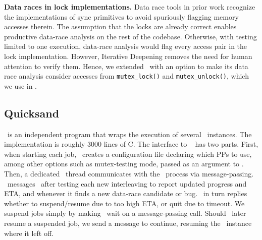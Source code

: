 {\bf Data races in lock implementations.}
Data race tools in prior work \cite{tsan,portend} recognize the implementations of sync primitives to avoid spuriously flagging memory accesses therein. %
The assumption that the locks are already correct enables productive data-race analysis on the rest of the codebase.
Otherwise, with testing limited to one execution,
data-race analysis would flag every access pair in the lock implementation. %
However, Iterative Deepening removes the need for human attention to verify them. %
Hence, we extended \landslide~with an option to make its data race analysis consider accesses from {\tt mutex\_lock()} and {\tt mutex\_unlock()},
which we use in \sect{\ref{sec:testsuite}}.

\subsection{Quicksand}

\quicksand~is an independent program that wraps the execution of several \landslide~instances.
The implementation is roughly 3000 lines of C.
The interface to \landslide~ has two parts. %
First, when starting each job, \quicksand~creates a configuration file declaring which PPs to use,
among other options such as mutex-testing mode,
passed as an argument to \landslide.
Then, a dedicated \quicksand~thread communicates with the \landslide~process via message-passing. %
\landslide~messages \quicksand~after testing each new interleaving to report updated progress and ETA,
and whenever it finds a new data-race candidate or bug.
\quicksand~in turn replies whether to suspend/resume due to too high ETA, or quit due to timeout.
We suspend jobs simply by making \landslide~wait on a message-passing call.
Should \quicksand~later resume a suspended job, we send a message to continue,
resuming the \landslide~instance where it left off.

